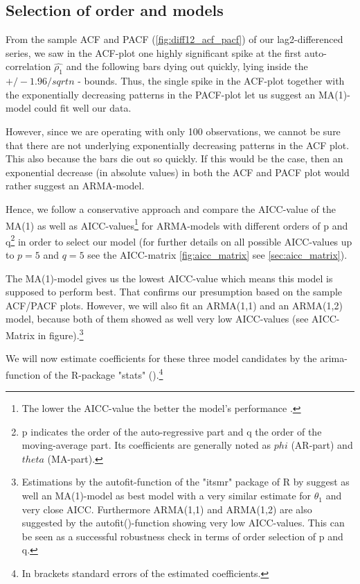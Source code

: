 \documentclass[11pt,a4paper]{article}
\begin{document}
\subsection{Selection of order and models}

From the sample ACF and PACF (\cref{fig:diff12_acf_pacf}) of our lag2-differenced series, we saw in the ACF-plot one highly significant spike at the first auto-correlation $\hat{\rho_1}$ and the following bars dying out quickly, lying inside the $+/-1.96/sqrt{n}$ - bounds.
Thus, the single spike in the ACF-plot together with the exponentially decreasing patterns in the PACF-plot let us suggest an MA(1)-model could fit well our data.

However, since we are operating with only 100 observations, we cannot be sure that there are not underlying exponentially decreasing patterns in the ACF plot. This also because the bars die out so quickly.
If this would be the case, then an exponential decrease (in absolute values) in both the ACF and PACF plot would rather suggest an ARMA-model.


Hence, we follow a conservative approach and compare the AICC-value of the MA(1) as well as AICC-values\footnote{
    The lower the AICC-value the better the model's performance \citep{aic86}.
}  for ARMA-models with different orders of p and q\footnote{
    p indicates the order of the auto-regressive part and q the order of the moving-average part.
    Its coefficients are generally noted as $phi$ (AR-part) and $theta$ (MA-part).} 
in order to select our model (for further details on all possible AICC-values up to $p=5$ and $q=5$ see the AICC-matrix \cref{fig:aicc_matrix} see \cref{sec:aicc_matrix}).

The MA(1)-model gives us the lowest AICC-value which means this model is supposed to perform best. That confirms our presumption based on the sample ACF/PACF plots.
However, we will also fit an ARMA(1,1) and an ARMA(1,2) model, because both of them showed as well very low AICC-values (see AICC-Matrix in figure).\footnote{
    Estimations by the autofit-function of the "itsmr" package of R by \citet{R_itsmr} suggest as well an MA(1)-model as best model with a very similar estimate for $\theta_1$ and very close AICC.
    Furthermore ARMA(1,1) and ARMA(1,2) are also suggested by the autofit()-function showing very low AICC-values.
    This can be seen as a successful robustness check in terms of order selection of p and q.
}

We will now estimate coefficients for these three model candidates by the arima-function of the R-package "stats" (\citet{R_stats}).\footnote{In brackets standard errors of the estimated coefficients.}
\end{document}
